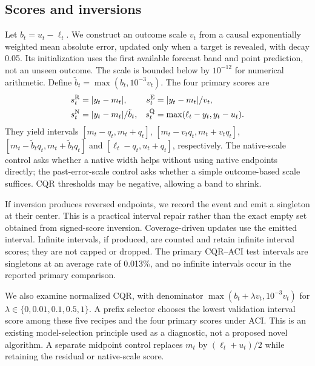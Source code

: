 \documentclass[preprint,11pt]{elsarticle}
\begin{document}
\subsection{Scores and inversions}
Let $b_t=u_t-\ell_t$. We construct an outcome scale $v_t$ from a causal exponentially
weighted mean absolute error, updated only when a target is revealed, with decay 0.05.
Its initialization uses the first available forecast band and point prediction, not an
unseen outcome. The scale is bounded below by $10^{-12}$ for numerical arithmetic.
Define $\tilde b_t=\max(b_t,10^{-3}v_t)$. The four primary scores are
\begin{align}
 s_t^{\rm R}&=|y_t-m_t|,&
 s_t^{\rm E}&=|y_t-m_t|/v_t,\\
 s_t^{\rm N}&=|y_t-m_t|/\tilde b_t,&
 s_t^{\rm Q}&=\max(\ell_t-y_t,y_t-u_t).
\end{align}
They yield intervals $[m_t-q_t,m_t+q_t]$, $[m_t-v_tq_t,m_t+v_tq_t]$,
$[m_t-\tilde b_tq_t,m_t+\tilde b_tq_t]$ and $[\ell_t-q_t,u_t+q_t]$, respectively.
The native-scale control asks whether a native width helps without using native endpoints
directly; the past-error-scale control asks whether a simple outcome-based scale suffices.
CQR thresholds may be negative, allowing a band to shrink.

If inversion produces reversed endpoints, we record the event and emit a singleton at
their center. This is a practical interval repair rather than the exact empty set obtained
from signed-score inversion. Coverage-driven updates use the emitted interval. Infinite
intervals, if produced, are counted and retain infinite interval scores; they are not
capped or dropped. The primary CQR--ACI test intervals are singletons at an average rate
of 0.013\%, and no infinite intervals occur in the reported primary comparison.

We also examine normalized CQR, with denominator
$\max(b_t+\lambda v_t,10^{-3}v_t)$ for $\lambda\in\{0,0.01,0.1,0.5,1\}$.
A prefix selector chooses the lowest validation interval score among these five recipes
and the four primary scores under ACI. This is an existing model-selection principle used
as a diagnostic, not a proposed novel algorithm. A separate midpoint control replaces
$m_t$ by $(\ell_t+u_t)/2$ while retaining the residual or native-scale score.
\end{document}
